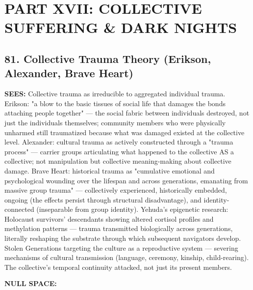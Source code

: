 \section*{PART XVII: COLLECTIVE SUFFERING \& DARK NIGHTS}


\subsection*{81. Collective Trauma Theory (Erikson, Alexander, Brave Heart)}


\textbf{SEES:} Collective trauma as irreducible to aggregated individual trauma. Erikson: "a blow to the basic tissues of social life that damages the bonds attaching people together" — the social fabric between individuals destroyed, not just the individuals themselves; community members who were physically unharmed still traumatized because what was damaged existed at the collective level. Alexander: cultural trauma as actively constructed through a "trauma process" — carrier groups articulating what happened to the collective AS a collective; not manipulation but collective meaning-making about collective damage. Brave Heart: historical trauma as "cumulative emotional and psychological wounding over the lifespan and across generations, emanating from massive group trauma" — collectively experienced, historically embedded, ongoing (the effects persist through structural disadvantage), and identity-connected (inseparable from group identity). Yehuda's epigenetic research: Holocaust survivors' descendants showing altered cortisol profiles and methylation patterns — trauma transmitted biologically across generations, literally reshaping the substrate through which subsequent navigators develop. Stolen Generations targeting the culture as a reproductive system — severing mechanisms of cultural transmission (language, ceremony, kinship, child-rearing). The collective's temporal continuity attacked, not just its present members.


\textbf{NULL SPACE:}

